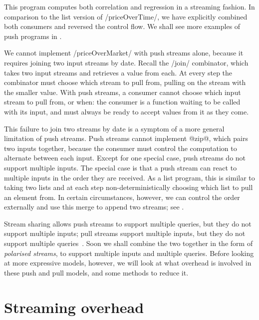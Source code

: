 This program computes both correlation and regression in a streaming fashion.
In comparison to the list version of \Hs/priceOverTime/, we have explicitly combined both consumers and reversed the control flow.
We shall see more examples of push programs in .

We cannot implement \Hs/priceOverMarket/ with push streams alone, because it requires joining two input streams by date.
Recall the \Hs/join/ combinator, which takes two input streams and retrieves a value from each.
At every step the combinator must choose which stream to pull from, pulling on the stream with the smaller value.
With push streams, a consumer cannot choose which input stream to pull from, or when: the consumer is a function waiting to be called with its input, and must always be ready to accept values from it as they come.

This failure to join two streams by date is a symptom of a more general limitation of push streams.
Push streams cannot implement @zip@, which pairs two inputs together, because the consumer must control the computation to alternate between each input.
Except for one special case, push streams do not support multiple inputs.
The special case is that a push stream can react to multiple inputs in the order they are received.
As a list program, this is similar to taking two lists and at each step non-deterministically choosing which list to pull an element from.
In certain circumstances, however, we can control the order externally and use this merge to append two streams; see .

Stream sharing allows push streams to support multiple queries, but they do not support multiple inputs; pull streams support multiple inputs, but they do not support multiple queries~\citep{kay2009you}.
Soon  we shall combine the two together in the form of \emph{polarised streams}, to support multiple inputs and multiple queries.
Before looking at more expressive models, however, we will look at what overhead is involved in these push and pull models, and some methods to reduce it.

\section{Streaming overhead}

